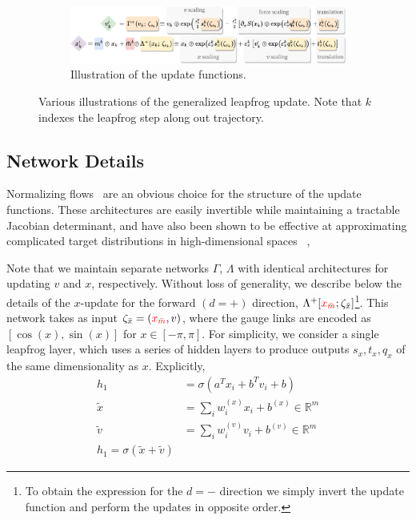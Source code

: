 \documentclass[a4paper,11pt]{article}
\newcommand{\xmaskbar}{\textcolor{red}{x_{\bar{m}}}}
\begin{document}
\begin{figure}
    \begin{subfigure}[b]{\textwidth}
        \includegraphics[width=\textwidth]{assets/network_functions6.pdf}
        \caption{\label{subfig:network_fns}Illustration of the update
        functions.}
    \end{subfigure}
    \caption{\label{fig:networks}Various illustrations of the generalized
        leapfrog update. Note that \(k\) indexes the leapfrog step along out
    trajectory.}
\end{figure}
%
%
\subsection{\label{subsec:networks}Network Details}
%
Normalizing flows~\cite{dinhDensityEstimationUsing2016b} are an obvious choice
for the structure of the update functions.
%
These architectures are easily invertible while maintaining a tractable
Jacobian determinant, and have also been shown to be effective at approximating
complicated target distributions in high-dimensional spaces ~\cite{%
    foremanDeepLearningHamiltonian2021a,
    dinhDensityEstimationUsing2016b,
    albergoFlowbasedGenerativeModels2019b,%
    boydaSamplingUsingSU2020a,%
    kanwarEquivariantFlowbasedSampling2020a,%
    wehenkelYouSayNormalizing2020a,%
    levyGeneralizingHamiltonianMonte2018b,%
    neklyudovOrbitalMCMC2020a,%
    neklyudovInvolutiveMcmcUnifying2020a%
},

Note that we maintain separate networks \(\Gamma\), \(\Lambda\) with
identical architectures for updating \(v\) and \(x\), respectively.
%
Without loss of generality, we describe below the details of the \(x\)-update
for the forward \((d = +)\) direction, \(\Lambda^{+}[\xmaskbar;
\zeta_{\bar{x}}]\)\footnote{
    To obtain the expression for the \(d=-\) direction we simply invert the
    update function and perform the updates in opposite order.
}.
%
This network takes as input \(\zeta_{\bar{x}} = (\xmaskbar, v)\), where the
gauge links are encoded as \([\cos(x), \sin(x)]\) for \(x \in [-\pi, \pi]\).
%
For simplicity, we consider a single leapfrog layer, which uses a series of
hidden layers to produce outputs \(s_{x}, t_{x}, q_{x}\) of the same
dimensionality as \(x\).
%
%
%
Explicitly,
%
\begin{align}
    h_{1} &= \sigma\left(a^{T} x_{i} + b^{T} v_{i} + b\right)\\
    \tilde{x} &= \sum_{i} w_{i}^{(x)} x_{i} + b^{(x)} \in \mathbb{R}^{m}\\
    \tilde{v} &= \sum_{i} w_{i}^{(v)} v_{i} + b^{(v)} \in \mathbb{R}^{m}\\
    h_{1} = \sigma(\tilde x + \tilde{v})
\end{align}
\end{document}

